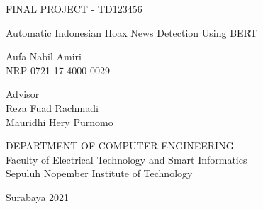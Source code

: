 FINAL PROJECT - TD123456

\vspace{6ex}

\begin{large}
    Automatic Indonesian Hoax News Detection Using BERT
\end{large}

\vspace{4ex}

Aufa Nabil Amiri \\
NRP 0721 17 4000 0029

\vspace{2ex}

Advisor \\
Reza Fuad Rachmadi \\
Mauridhi Hery Purnomo

\vspace{6ex}

DEPARTMENT OF COMPUTER ENGINEERING \\
Faculty of Electrical Technology and Smart Informatics \\
Sepuluh Nopember Institute of Technology

Surabaya 2021
